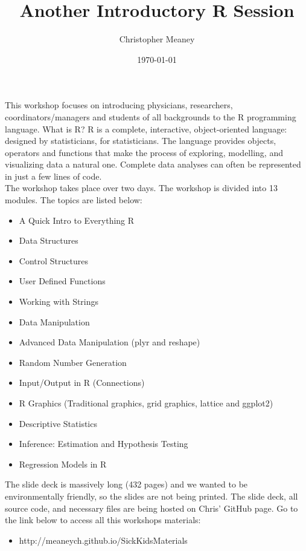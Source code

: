 \documentclass[10pt, a4paper]{article}\usepackage[]{graphicx}\usepackage[]{color}
\title{Another Introductory R Session}
\author{Christopher Meaney}
\date{\today}
\begin{document}
\maketitle

This workshop focuses on introducing physicians, researchers, coordinators/managers and students of all backgrounds to the R programming language. What is R? R is a complete, interactive, object-oriented language: designed by statisticians, for statisticians. The language provides objects, operators and functions that make the process of exploring, modelling, and visualizing data a natural one. Complete data analyses can often be represented in just a few lines of code. \\

The workshop takes place over two days. The workshop is divided into 13 modules. The topics are listed below: \\

\begin{itemize}
\item A Quick Intro to Everything R 
\item Data Structures 
\item Control Structures
\item User Defined Functions
\item Working with Strings
\item Data Manipulation 
\item Advanced Data Manipulation (plyr and reshape)
\item Random Number Generation
\item Input/Output in R (Connections)
\item R Graphics (Traditional graphics, grid graphics, lattice and ggplot2)
\item Descriptive Statistics
\item Inference: Estimation and Hypothesis Testing
\item Regression Models in R
\end{itemize}

The slide deck is massively long (432 pages) and we wanted to be environmentally friendly, so the slides are not being printed. The slide deck, all source code, and necessary files are being hosted on Chris' GitHub page. Go to the link below to access all this workshops materials: \\

\begin{itemize}
\item http://meaneych.github.io/SickKidsMaterials
\end{itemize}
\end{document}
